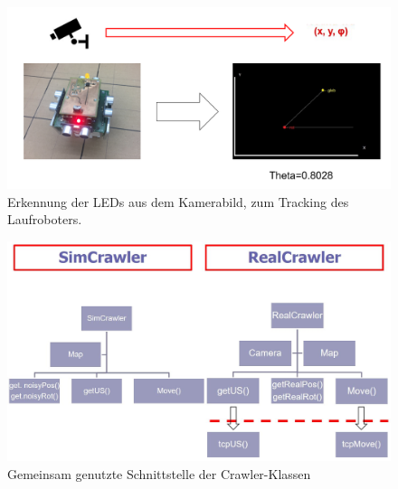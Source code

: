 \begin{figure}
	\centering
	\includegraphics[width=0.9\linewidth]{Images/camera.png}
	\caption{Erkennung der LEDs aus dem Kamerabild, zum Tracking des Laufroboters.}
	\label{fig:crawler}
\end{figure}

\begin{figure}
	\centering
	\includegraphics[width=0.9\linewidth]{Images/crawlerklass.jpg}
	\caption{Gemeinsam genutzte Schnittstelle der Crawler-Klassen}
	\label{fig:crawler}
\end{figure}
\clearpage
